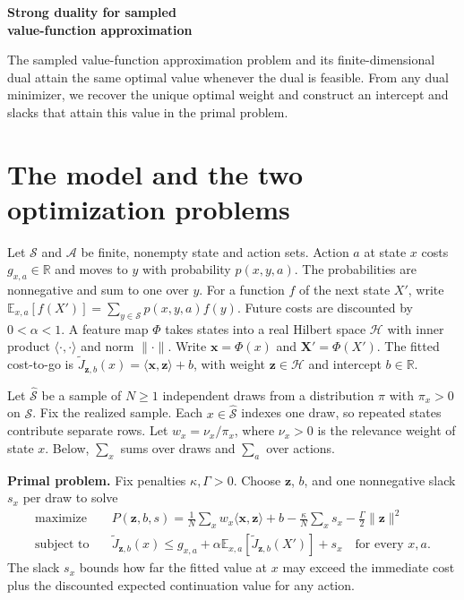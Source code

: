 \documentclass[12pt,a4paper]{article}
\newcommand{\ip}[2]{\langle #1,#2\rangle}
\newcommand{\norm}[1]{\lVert #1\rVert}
\newcommand{\R}{\mathbb R}
\newcommand{\lead}[1]{\par\smallskip\noindent\textbf{#1}\enspace}
\begin{document}
{\LARGE\bfseries Strong duality for sampled\\[2pt] value-function approximation\par}
\medskip
The sampled value-function approximation problem and its finite-dimensional
dual attain the same optimal value whenever the dual is feasible. From any
dual minimizer, we recover the unique optimal weight and construct an
intercept and slacks that attain this value in the primal problem.

\section*{The model and the two optimization problems}
Let \(\mathcal S\) and \(\mathcal A\) be finite, nonempty state and action sets.
Action \(a\) at state \(x\) costs \(g_{x,a}\in\R\) and moves to \(y\) with probability
\(p(x,y,a)\). The probabilities are nonnegative and sum to one over \(y\).
For a function \(f\) of the next state \(X'\), write
\(\mathbb E_{x,a}[f(X')]=\sum_{y\in\mathcal S}p(x,y,a)f(y)\).
Future costs are discounted by \(0<\alpha<1\).
A feature map \(\Phi\) takes states into a real Hilbert space \(\mathcal H\)
with inner product \(\ip{\cdot}{\cdot}\) and norm \(\norm{\cdot}\).
Write \(\mathbf x=\Phi(x)\) and \(\mathbf X'=\Phi(X')\). The fitted cost-to-go
is \(\widetilde J_{\mathbf z,b}(x)=\ip{\mathbf x}{\mathbf z}+b\), with
weight \(\mathbf z\in\mathcal H\) and intercept \(b\in\R\).

Let \(\widehat{\mathcal S}\) be a sample of \(N\ge1\) independent draws from
a distribution \(\pi\) with \(\pi_x>0\) on \(\mathcal S\). Fix the realized sample.
Each \(x\in\widehat{\mathcal S}\) indexes one draw, so repeated states contribute
separate rows. Let \(w_x=\nu_x/\pi_x\), where \(\nu_x>0\) is the relevance
weight of state \(x\). Below, \(\sum_x\) sums over draws and \(\sum_a\) over actions.

\lead{Primal problem.} Fix penalties \(\kappa,\Gamma>0\). Choose
\(\mathbf z\), \(b\), and one nonnegative slack \(s_x\) per draw to solve
\[
 \begin{aligned}
   \text{maximize}\quad &P(\mathbf z,b,s)=
     \frac1N\sum_x w_x\ip{\mathbf x}{\mathbf z}+b
       -\frac{\kappa}{N}\sum_x s_x-\frac{\Gamma}{2}\norm{\mathbf z}^2\\
   \text{subject to}\quad &
     \widetilde J_{\mathbf z,b}(x)\le g_{x,a}
        +\alpha\mathbb E_{x,a}[\widetilde J_{\mathbf z,b}(X')]+s_x
        \quad\text{for every }x,a .
 \end{aligned}
 \tag{P}
\]
The slack \(s_x\) bounds how far the fitted value at \(x\) may exceed the
immediate cost plus the discounted expected continuation value for any action.
\end{document}
